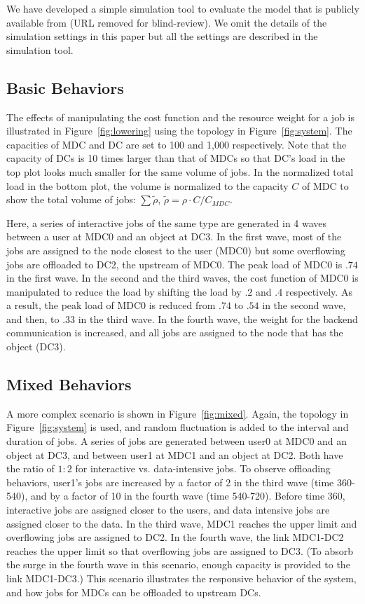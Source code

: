 
We have developed a simple simulation tool to evaluate the model
that is publicly available from (URL removed for blind-review).
We omit the details of the simulation settings in this paper but all
the settings are described in the simulation tool.

\subsection{Basic Behaviors}

The effects of manipulating the cost function and the resource weight
for a job is illustrated in Figure~\ref{fig:lowering} using the
topology in Figure~\ref{fig:system}.
The capacities of MDC and DC are set to 100 and 1,000 respectively.
Note that the capacity of DCs is 10 times larger than that of MDCs
so that DC's load in the top plot looks much smaller for the same
volume of jobs.
In the normalized total load in the bottom plot, the volume is normalized
to the capacity $C$ of MDC to show the total volume of jobs:
$\sum \tilde{\rho}$, \:$\tilde{\rho} = \rho \cdot C/C_{MDC}$.

Here, a series of interactive jobs of the same type are generated in
4 waves between a user at MDC0 and an object at DC3.
In the first wave,  most of the jobs are assigned to the node closest
to the user (MDC0) but some overflowing jobs are offloaded to DC2, the
upstream of MDC0.
The peak load of MDC0 is $.74$ in the first wave.
In the second and the third waves, the cost function of MDC0 is
manipulated to reduce the load by shifting the load by $.2$ and $.4$
respectively. As a result, the peak load of MDC0 is
reduced from $.74$ to $.54$ in the second wave, and then, to $.33$ in the
third wave.
In the fourth wave, the weight for the backend communication is
increased, and all jobs are assigned to the node that has the object
(DC3).

\subsection{Mixed Behaviors}

A more complex scenario is shown in Figure~\ref{fig:mixed}.
Again, the topology in Figure~\ref{fig:system} is used, and
random fluctuation is added to the interval and duration of jobs.
A series of jobs are generated
between user0 at MDC0 and an object at DC3, and
between user1 at MDC1 and an object at DC2.
Both have the ratio of $1:2$ for interactive vs. data-intensive jobs.
To observe offloading behaviors, user1's jobs are increased by a
factor of 2 in the third wave (time 360-540), and by a factor of 10 in
the fourth wave (time 540-720).
Before time 360, interactive jobs are assigned closer to the users,
and data intensive jobs are assigned closer to the data.
In the third wave, MDC1 reaches the upper limit and overflowing jobs are
assigned to DC2.
In the fourth wave, the link MDC1-DC2 reaches the upper limit so that
overflowing jobs are assigned to DC3.
(To absorb the surge in the fourth wave in this scenario, enough
capacity is provided to the link MDC1-DC3.)
This scenario illustrates the responsive behavior of the system,
and how jobs for MDCs can be offloaded to upstream DCs.


